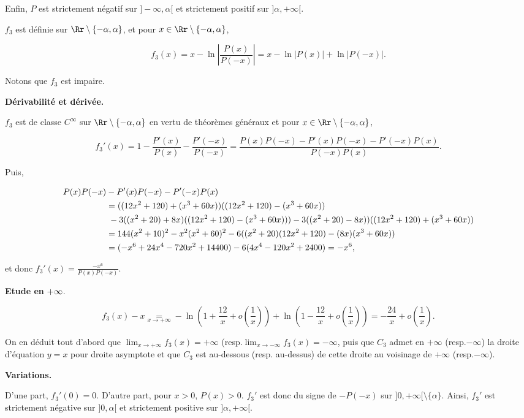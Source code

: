 {\begin{enumerate}
{{{Enfin, $P$ est strictement négatif sur $]-\infty,\alpha[$ et strictement positif sur $]\alpha,+\infty[$.

$f_3$ est définie sur $\Rr\setminus\{-\alpha,\alpha\}$, et pour $x\in\Rr\setminus\{-\alpha,\alpha\}$, 

$$f_3(x)=x-\ln\left|\frac{P(x)}{P(-x)}\right|=x-\ln|P(x)|+\ln|P(-x)|.$$
 
Notons que $f_3$ est impaire.
 
\textbf{Dérivabilité et dérivée.}

$f_3$ est de classe $C^\infty$ sur $\Rr\setminus\{-\alpha,\alpha\}$ en vertu de théorèmes généraux et pour $x\in\Rr\setminus\{-\alpha,\alpha\}$,

$$f_3'(x)=1-\frac{P'(x)}{P(x)}-\frac{P'(-x)}{P(-x)}=\frac{P(x)P(-x)-P'(x)P(-x)-P'(-x)P(x)}{P(-x)P(x)}.$$

Puis,

\begin{align*}\ensuremath 
P(x)P(-x)&-P'(x)P(-x)-P'(-x)P(x)\\
 &=((12x^2+120)+(x^3+60x))((12x^2+120)-(x^3+60x))\\
 &\;-3((x^2+20)+8x)((12x^2+120)-(x^3+60x)))-
3((x^2+20)-8x))((12x^2+120)+(x^3+60x))\\
 &=144(x^2+10)^2-x^2(x^2+60)^2-6((x^2+20)(12x^2+120)-(8x)(x^3+60x))\\
 &=(-x^6+24x^4-720x^2+14400)-6(4x^4-120x^2+2400)=-x^6,
\end{align*}

et donc $f_3'(x)=\frac{-x^6}{P(x)P(-x)}$.

\textbf{Etude en} $\bf{+{\infty}}$.

$$f_3(x)-x\underset{x\rightarrow+\infty}{=}-\ln(1+\frac{12}{x}+o(\frac{1}{x}))+\ln(1-\frac{12}{x}+o(\frac{1}{x}))=-\frac{24}{x}+o(\frac{1}{x}).$$

On en déduit tout d'abord que $\lim_{x\rightarrow +\infty}f_3(x)=+\infty$ (resp.$\lim_{x\rightarrow -\infty}f_3(x)=-\infty$, puis que $C_3$ admet en $+\infty$ (resp.$-\infty$) la droite d'équation $y=x$ pour droite asymptote et que $C_3$ est au-dessous (resp. au-dessus) de cette droite au voisinage de $+\infty$ (resp.$-\infty$).

\textbf{Variations.}

D'une part, $f_3'(0)=0$. D'autre part, pour $x>0$, $P(x)>0$. $f_3'$ est donc du signe de $-P(-x)$ sur $]0,+\infty[\setminus\{\alpha\}$. Ainsi, $f_3'$ est strictement négative sur $]0,\alpha[$ et strictement positive sur $]\alpha,+\infty[$.

}}}
\end{enumerate}}
